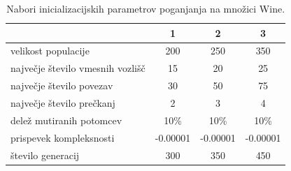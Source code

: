 \begin{table}[H]
    \begin{center}
        \begin{tabular}{||l c c c||}
            \hline
            & 1        & 2        & 3 \\ [0.5ex]
            \hline
            velikost populacije               & 200      & 250      & 350      \\
            \hline
            največje število vmesnih vozlišč & 15       & 20       & 25       \\
            \hline
            največje število povezav          & 30       & 50       & 75       \\
            \hline
            največje število prečkanj         & 2        & 3        & 4        \\
            \hline
            delež mutiranih potomcev          & 10\%     & 10\%     & 10\%     \\
            \hline
            prispevek kompleksnosti           & -0.00001 & -0.00001 & -0.00001 \\
            \hline
            število generacij                 & 300      & 350      & 450      \\
            \hline
        \end{tabular}
    \end{center}
    \caption{Nabori inicializacijskih parametrov poganjanja na množici Wine.}
    \label{tab:param_wine}
\end{table}

